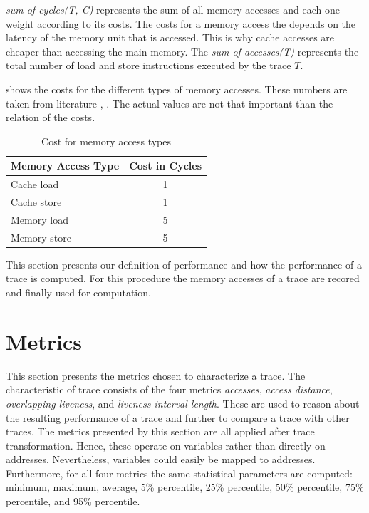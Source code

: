 \documentclass[onecolumn, openright, master, english, signatures]{dbrgrptt}
\begin{document}
\emph{sum of cycles(T, C)} represents the sum of all memory accesses and each one weight according to its costs.
The costs for a memory access the depends on the latency of the memory unit that is accessed.
This is why cache accesses are cheaper than accessing the main memory.
The \emph{sum of accesses(T)} represents the total number of load and store instructions executed by the \ac{trace} $T$.

 shows the costs for the different types of memory accesses.
These numbers are taken from literature \cite{drepper2007every}, \cite{skylake}.
The actual values are not that important than the relation of the costs.

\begin{table}[!ht]
  \centering
  \begin{tabular}{lc}
  \hline
  Memory Access Type & Cost in Cycles \\
  \hline
  Cache  load  & 1 \\
  Cache  store & 1 \\
  Memory load  & 5 \\
  Memory store & 5 \\
  \hline
  \end{tabular}
  \caption{Cost for memory access types}
  \label{tab:memory-access-cost}
\end{table}

This section presents our definition of performance and how the performance of a trace is computed.
For this procedure the memory accesses of a \ac{trace} are recored and finally used for computation.


\section{Metrics}\label{sec:metrics}

This section presents the metrics chosen to characterize a \ac{trace}.
The characteristic of \ac{trace} consists of the four metrics \emph{accesses}, \emph{access distance}, \emph{overlapping liveness}, and \emph{liveness interval length}.
These are used to reason about the resulting performance of a \ac{trace} and further to compare a \ac{trace} with other \ac{trace}s.
The metrics presented by this section are all applied after \ac{trace} transformation.
Hence, these operate on variables rather than directly on addresses.
Nevertheless, variables could easily be mapped to addresses.
Furthermore, for all four metrics the same statistical parameters are computed: minimum, maximum, average, 5\% percentile, 25\% percentile, 50\% percentile, 75\% percentile, and 95\% percentile.
\end{document}

